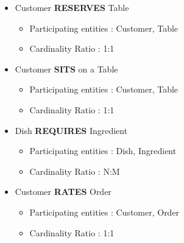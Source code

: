 \begin{itemize}
                \item Customer \textbf{RESERVES} Table
                \begin{itemize}[label=-]
                    \item Participating entities : Customer, Table
                    \item Cardinality Ratio : 1:1
                \end{itemize}

            \item Customer \textbf{SITS} on a Table
                \begin{itemize}[label=-]
                    \item Participating entities : Customer, Table
                    \item Cardinality Ratio : 1:1
                \end{itemize}


            \item Dish \textbf{REQUIRES} Ingredient
                \begin{itemize}[label=-]
                    \item Participating entities : Dish, Ingredient
                    \item Cardinality Ratio : N:M
                \end{itemize}

            \item Customer \textbf{RATES} Order
                \begin{itemize}[label=-]
                    \item Participating entities : Customer, Order
                    \item Cardinality Ratio : 1:1
                \end{itemize}
        \end{itemize}
